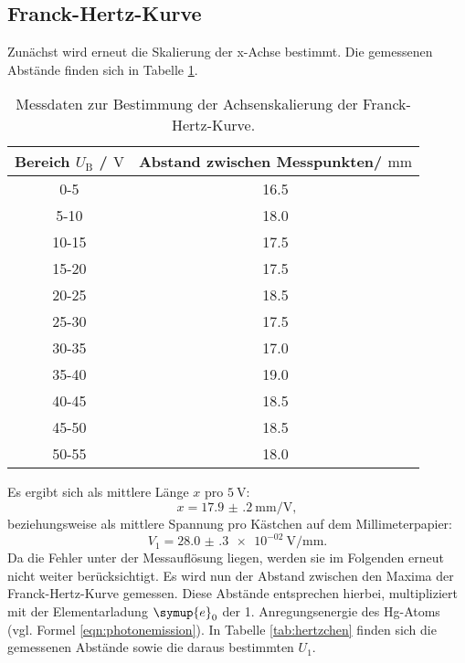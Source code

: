 \FloatBarrier
\subsection{Franck-Hertz-Kurve}
Zunächst wird erneut die Skalierung der x-Achse bestimmt.
Die gemessenen Abstände finden sich in Tabelle \ref{tab:franckie}.
\begin{table}
 \centering
 \caption{Messdaten zur Bestimmung der Achsenskalierung der Franck-Hertz-Kurve.}
 \label{tab:franckie}
 \begin{tabular}{cc}
	 \toprule
	 Bereich $U_{\mathrm{B}}$ / $\si{\volt}$ & Abstand zwischen Messpunkten/ $\si{\milli\meter}$ \\
	 \midrule
	 0-5 & 16.5 \\
	 5-10 & 18.0 \\
	 10-15 & 17.5 \\
	 15-20 & 17.5 \\
	 20-25 & 18.5 \\
	 25-30 & 17.5 \\
	 30-35 & 17.0 \\
	 35-40 & 19.0 \\
	 40-45 & 18.5 \\
	 45-50 & 18.5 \\
	 50-55 & 18.0 \\
	 \bottomrule
 \end{tabular}
\end{table}
Es ergibt sich als mittlere Länge $x$ pro $\SI{5}{\volt}$:
\begin{equation}
	x=\SI{17.9(2)}{\milli\meter\per\volt} \mathrm{,}
\end{equation}
beziehungsweise als mittlere Spannung pro Kästchen auf dem Millimeterpapier:
\begin{equation}
	V_1= \SI{28.0(3)e-02}{\volt\per\milli\meter} \mathrm{.}
\end{equation}
Da die Fehler unter der Messauflösung liegen, werden sie im Folgenden erneut nicht weiter berücksichtigt.
Es wird nun der Abstand zwischen den Maxima der Franck-Hertz-Kurve gemessen. Diese Abstände entsprechen hierbei, multipliziert mit der Elementarladung $\symup{e}_0$ der 1. Anregungsenergie des Hg-Atoms (vgl. Formel \eqref{eqn:photonemission}).
In Tabelle \ref{tab:hertzchen} finden sich die gemessenen Abstände sowie die daraus bestimmten $U_\mathrm{1}$.
